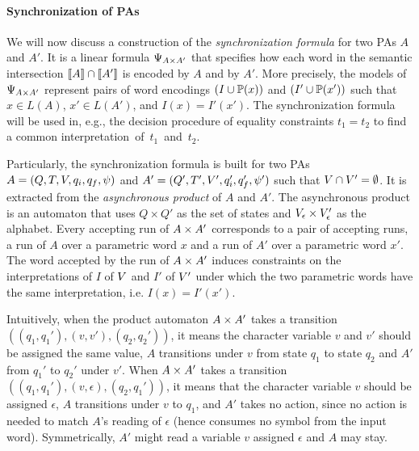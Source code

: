 \documentclass[sigplan,review,anonymous]{acmart}\settopmatter{printfolios=true,printccs=false,printacmref=false}
\begin{document}
\paragraph{Synchronization of PAs}
We will now discuss a construction of the \emph{synchronization formula} for two PAs $A$ and $A'$. 
It is a linear formula $\Psi_{A \times A'}$ 
that specifies how each word in the semantic intersection $[\![A]\!] \cap [\![A']\!]$ is encoded by $A$ and by $A'$.
%
More precisely, the models of $\Psi_{A \times A'}$ represent pairs of word
encodings $(I\cup \mathbb{P}{(x)})$ and $(I'\cup \mathbb{P}{(x')})$ such that $x\in L(A)$, $x'\in L(A')$, and 
$I(x) = I'(x')$.
The synchronization formula will be used in, e.g., the decision procedure of equality constraints $t_1=t_2$ to find a common interpretation~of~$t_1$~and~$t_2$. 

Particularly, the synchronization formula is built for two PAs 
$A = (Q,T,V,q_i,q_f,\psi)$ and ${A'} = (Q',T',V',q_i',q_f',\psi')$ such that $V \cap V' = \emptyset$. 
%
It is extracted from the \emph{asynchronous product} of $A$ and $A'$. 
%
The asynchronous product is an automaton that uses $Q\times Q'$ as the set of states and 
$V_\epsilon\times V'_\epsilon$
as the alphabet. 
%
Every accepting run of $A \times A'$ corresponds to a pair of accepting runs, 
a run of $A$ over a parametric word $x$ and a run of ${A'}$ over a parametric word $x'$. 
The word accepted by the run of $A \times A'$ induces constraints on the interpretations of $I$ of $V$ and $I'$ of $V'$ under which the two parametric words have the same interpretation, i.e. $I(x) = I'(x')$. 

Intuitively, when the product automaton $A \times A'$ takes a transition $((q_1,q_1'), (v,v'),(q_2,q_2'))$, 
it means the character variable $v$ and $v'$ should be assigned the same value,
$A$ transitions under $v$ from state $q_1$ to state $q_2$ and ${A'}$ from $q_1'$ to $q_2'$ under $v'$.
%
When $A \times A'$ takes a transition $((q_1,q_1'), (v,\epsilon),(q_2,q_1'))$, 
it means that the character variable $v$ should be assigned $\epsilon$, 
$A$ transitions under $v$ to $q_1$, and ${A'}$ takes no action, since no action is needed to match $A$'s reading of $\epsilon$ (hence consumes no symbol from the input word). Symmetrically, ${A'}$ might read a variable $v$ assigned $\epsilon$ and $A$ may stay.
\end{document}
